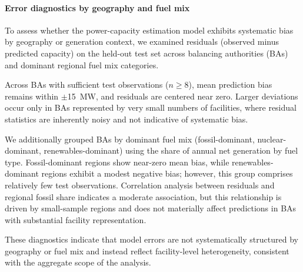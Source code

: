 \documentclass[12pt]{article}
\begin{document}
\paragraph{Error diagnostics by geography and fuel mix}

To assess whether the power-capacity estimation model exhibits systematic bias by geography or generation context, we examined residuals (observed minus predicted capacity) on the held-out test set across balancing authorities (BAs) and dominant regional fuel mix categories.

Across BAs with sufficient test observations ($n \geq 8$), mean prediction bias remains within $\pm$15~MW, and residuals are centered near zero. Larger deviations occur only in BAs represented by very small numbers of facilities, where residual statistics are inherently noisy and not indicative of systematic bias.

We additionally grouped BAs by dominant fuel mix (fossil-dominant, nuclear-dominant, renewables-dominant) using the share of annual net generation by fuel type. Fossil-dominant regions show near-zero mean bias, while renewables-dominant regions exhibit a modest negative bias; however, this group comprises relatively few test observations. Correlation analysis between residuals and regional fossil share indicates a moderate association, but this relationship is driven by small-sample regions and does not materially affect predictions in BAs with substantial facility representation.

These diagnostics indicate that model errors are not systematically structured by geography or fuel mix and instead reflect facility-level heterogeneity, consistent with the aggregate scope of the analysis.
\end{document}
